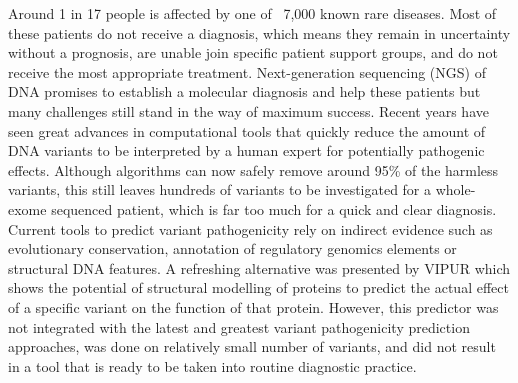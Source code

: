 Around 1 in 17 people is affected by one of ~7,000 known rare diseases. Most of these patients do not receive a diagnosis, which means they remain in uncertainty without a prognosis, are unable join specific patient support groups, and do not receive the most appropriate treatment.
Next-generation sequencing (NGS) of DNA promises to establish a molecular diagnosis and help these patients but many challenges still stand in the way of maximum success.
    Recent years have seen great advances in computational tools that quickly reduce the amount of DNA variants to be interpreted by a human expert for potentially pathogenic effects. Although algorithms can now safely remove around 95\% of the harmless variants, this still leaves hundreds of variants to be investigated for a whole-exome sequenced patient, which is far too much for a quick and clear diagnosis.
Current tools to predict variant pathogenicity rely on indirect evidence such as evolutionary conservation, annotation of regulatory genomics elements or structural DNA features. A refreshing alternative was presented by VIPUR which shows the potential of structural modelling of proteins to predict the actual effect of a specific variant on the function of that protein. However, this predictor was not integrated with the latest and greatest variant pathogenicity prediction approaches, was done on relatively small number of variants, and did not result in a tool that is ready to be taken into routine diagnostic practice.